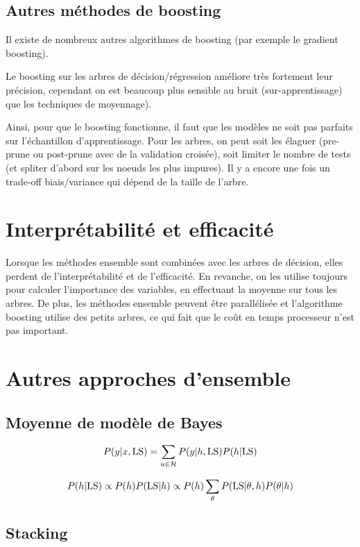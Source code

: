 	\subsection{Autres méthodes de boosting}
	
	Il existe de nombreux autres algorithmes de boosting (par exemple le gradient boosting).
	
	Le boosting sur les arbres de décision/régression améliore très fortement leur précision, cependant on est beaucoup plus sensible au bruit (sur-apprentissage) que les techniques de moyennage).
	
	Ainsi, pour que le boosting fonctionne, il faut que les modèles ne soit pas parfaits sur l'échantillon d'apprentissage. Pour les arbres, on peut soit les élaguer (pre-prune ou post-prune avec de la validation croisée), soit limiter le nombre de tests (et spliter d'abord sur les noeuds les plus impures). Il y a encore une fois un trade-off biais/variance qui dépend de la taille de l'arbre.
	
\section{Interprétabilité et efficacité}
	
Lorsque les méthodes ensemble sont combinées avec les arbres de décision, elles perdent de l'interprétabilité et de l'efficacité. En revanche, on les utilise toujours pour calculer l'importance des variables, en effectuant la moyenne sur tous les arbres. De plus, les méthodes ensemble peuvent être parallélisée et l'algorithme boosting utilise des petits arbres, ce qui fait que le coût en temps processeur n'est pas important.
		
	
\section{Autres approches d'ensemble}

	\subsection{Moyenne de modèle de Bayes}
	$$P(y \vert x, \text{LS}) = \sum_{u \in \mathcal{H}} P(y \vert h, \text{LS}) P(h \vert \text{LS})$$
	
	$$P(h \vert \text{LS}) \propto P(h) P(\text{LS} \vert h) \propto P(h) \sum_\theta P(\text{LS} \vert \theta, h) P(\theta \vert h)$$
	
	\subsection{Stacking}
	
